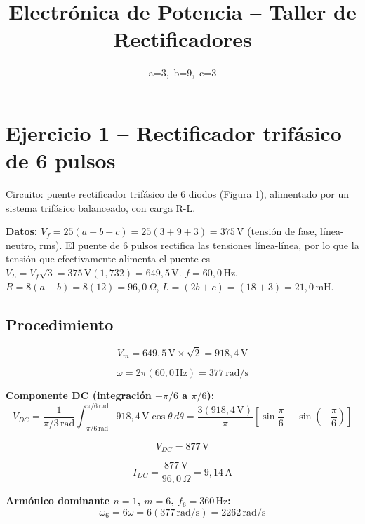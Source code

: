 \documentclass[12pt,a4paper]{article}
\title{Electrónica de Potencia -- Taller de Rectificadores}
\author{a=3,\ b=9,\ c=3}
\date{}
\begin{document}
\maketitle

\section{Ejercicio 1 -- Rectificador trifásico de 6 pulsos}

Circuito: puente rectificador trifásico de 6 diodos (Figura 1), alimentado por
un sistema trifásico balanceado, con carga R-L.

\textbf{Datos:} $V_f=25(a+b+c)=25(3+9+3)=375\,\text{V}$ (tensión de fase, línea-neutro, rms).
El puente de 6 pulsos rectifica las tensiones línea-línea, por lo que la tensión
que efectivamente alimenta el puente es
$V_L=V_f\sqrt3=375\,\text{V}(1{,}732)=649{,}5\,\text{V}$.
$f=60{,}0\,\text{Hz}$, $R=8(a+b)=8(12)=96{,}0\,\Omega$, $L=(2b+c)=(18+3)=21{,}0\,\text{mH}$.

\subsection{Procedimiento}

\begin{equation}
    V_m = 649{,}5\,\text{V}\times\sqrt{2} = 918{,}4\,\text{V}
\end{equation}

\begin{equation}
    \omega = 2\pi(60{,}0\,\text{Hz}) = 377\,\text{rad/s}
\end{equation}

\textbf{Componente DC (integración $-\pi/6$ a $\pi/6$):}
\begin{equation}
    V_{DC} = \frac{1}{\pi/3\,\text{rad}}\int_{-\pi/6\,\text{rad}}^{\pi/6\,\text{rad}} 918{,}4\,\text{V}\cos\theta\,d\theta
    = \frac{3(918{,}4\,\text{V})}{\pi}\left[\sin\frac{\pi}{6}-\sin\left(-\frac{\pi}{6}\right)\right]
\end{equation}

\begin{equation}
    \boxed{V_{DC} = 877\,\text{V}}
\end{equation}

\begin{equation}
    I_{DC} = \frac{877\,\text{V}}{96{,}0\,\Omega} = \boxed{9{,}14\,\text{A}}
\end{equation}

\textbf{Armónico dominante $n=1$, $m=6$, $f_6=360\,\text{Hz}$:}
\begin{equation}
    \omega_6 = 6\omega = 6(377\,\text{rad/s}) = 2262\,\text{rad/s}
\end{equation}
\end{document}
